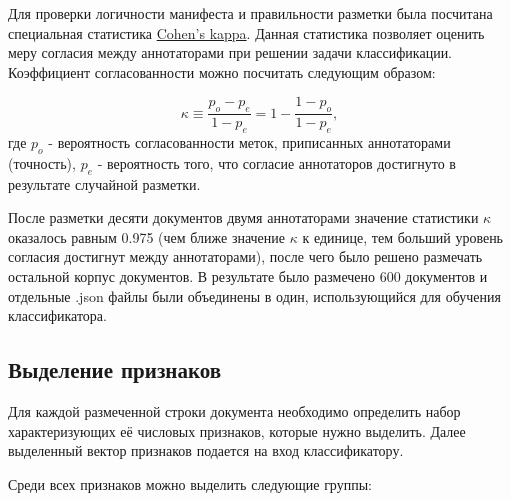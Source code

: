 \documentclass[a4paper,12pt]{article}
\begin{document}
Для проверки логичности манифеста и правильности разметки была посчитана специальная статистика \href{https://en.wikipedia.org/wiki/Cohen%27s_kappa}{Cohen's kappa}. Данная статистика позволяет оценить меру согласия между аннотаторами при решении задачи классификации. Коэффициент согласованности можно посчитать следующим образом:

$$ \kappa \equiv {\frac {p_o-p_e}{1-p_e}}=1-{\frac {1-p_o}{1-p_e}},$$
где $p_o$ - вероятность согласованности меток, приписанных аннотаторами (точность), $p_e$ - вероятность того, что согласие аннотаторов достигнуто в результате случайной разметки.

После разметки десяти документов двумя аннотаторами значение статистики $\kappa$ оказалось равным 0.975 (чем ближе значение $\kappa$ к единице, тем больший уровень согласия достигнут между аннотаторами), после чего было решено размечать остальной корпус документов. В результате было размечено 600 документов и отдельные .json файлы были объединены в один, использующийся для обучения классификатора.

\subsection{Выделение признаков}

Для каждой размеченной строки документа необходимо определить набор характеризующих её числовых признаков, которые нужно выделить. Далее выделенный вектор признаков подается на вход классификатору.

Среди всех признаков можно выделить следующие группы:
\end{document}

